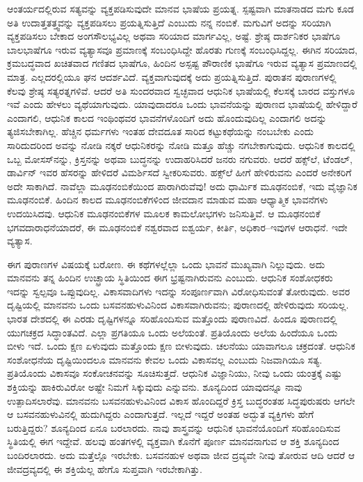 \vskip 0.2cm

ಆಂತರ್ಯದಲ್ಲಿರುವ ಸತ್ಯವನ್ನು ವ್ಯಕ್ತಪಡಿಸುವುದೇ ಮಾನವ ಭಾಷೆಯ ಪ್ರಯತ್ನ. ಸ್ಪಷ್ಟವಾಗಿ ಮಾತನಾಡದ ಮಗು ಕೂಡ ಅತಿ ಉದಾತ್ತತತ್ತ್ವವನ್ನು ವ್ಯಕ್ತಪಡಿಸಲು ಪ್ರಯತ್ನಿಸುತ್ತಿದೆ ಎಂಬುದು ನನ್ನ ನಂಬಿಕೆ. ಮಗುವಿಗೆ ಅದನ್ನು ಸರಿಯಾಗಿ ವ್ಯಕ್ತಪಡಿಸಲು ಬೇಕಾದ ಅಂಗಸೌಲಭ್ಯವಿಲ್ಲ ಅಥವಾ ಸರಿಯಾದ ಮಾರ್ಗವಿಲ್ಲ, ಅಷ್ಟೆ. ಶ್ರೇಷ್ಠ ದಾರ್ಶನಿಕರ ಭಾಷೆಗೂ ಬಾಲಭಾಷೆಗೂ ಇರುವ ವ್ಯತ್ಯಾಸವೂ ಪ್ರಮಾಣಕ್ಕೆ ಸಂಬಂಧಿಸಿದ್ದೇ ಹೊರತು ಗುಣಕ್ಕೆ ಸಂಬಂಧಿಸಿದ್ದಲ್ಲ. ಈಗಿನ ಸರಿಯಾದ, ಕ್ರಮಬದ್ಧವಾದ ಖಚಿತವಾದ ಗಣಿತದ ಭಾಷೆಗೂ, ಹಿಂದಿನ ಅಸ್ಪಷ್ಟ ಪೌರಾಣಿಕ ಭಾಷೆಗೂ ಇರುವ ವ್ಯತ್ಯಾಸ ಪ್ರಮಾಣದಲ್ಲಿ ಮಾತ್ರ. ಎಲ್ಲದರಲ್ಲಿಯೂ ಘನ ಆದರ್ಶವಿದೆ. ವ್ಯಕ್ತವಾಗುವುದಕ್ಕೆ ಅದು ಪ್ರಯತ್ನಿಸುತ್ತಿದೆ. ಪುರಾತನ ಪುರಾಣಗಳಲ್ಲಿ ಕೆಲವು ಶ್ರೇಷ್ಠ ಸತ್ಯರತ್ನಗಳಿವೆ. ಆದರೆ ಅತಿ ಸುಂದರವಾದ ಸ್ವಚ್ಛವಾದ ಆಧುನಿಕ ಭಾಷೆಯಲ್ಲಿ ಕೆಲಸಕ್ಕೆ ಬಾರದ ವಸ್ತುಗಳೂ ಇವೆ ಎಂದು ಹೇಳಲು ವ್ಯಥೆಯಾಗುವುದು. ಯಾವುದಾದರೂ ಒಂದು ಭಾವನೆಯನ್ನು ಪುರಾಣದ ಭಾಷೆಯಲ್ಲಿ ಹೇಳಿದ್ದಾರೆ ಎಂದಾಗಲಿ, ಆಧುನಿಕ ಕಾಲದ ಇಂಥಿಂಥವರ ಭಾವನೆಗಳೊಂದಿಗೆ ಅದು ಹೊಂದುವುದಿಲ್ಲ ಎಂದಾಗಲಿ ಅದನ್ನು ತ್ಯಜಿಸಬೇಕಾಗಿಲ್ಲ. ಹೆಚ್ಚಿನ ಧರ್ಮಗಳು ಇಂತಹ ದೇವದೂತ ಸಾರಿದ ಕಟ್ಟುಕಥೆಯನ್ನು ನಂಬಬೇಕು ಎಂದು ಸಾರಿದುದರಿಂದ ಅವನ್ನು ನೋಡಿ ನಕ್ಕರೆ ಆಧುನಿಕರನ್ನು ನೋಡಿ ಮತ್ತೂ ಹೆಚ್ಚು ನಗಬೇಕಾಗುವುದು. ಆಧುನಿಕ ಕಾಲದಲ್ಲಿ ಒಬ್ಬ ಮೋಸಸ್​ನನ್ನು, ಕ್ರಿಸ್ತನನ್ನು ಅಥವಾ ಬುದ್ಧನನ್ನು ಉದಾಹರಿಸಿದರೆ ಜನರು ನಗುವರು. ಆದರೆ ಹಕ್ಸ್​ಲೆ, ಟೆಂಡಲ್​, ಡಾರ್ವಿನ್​ ಇವರ ಹೆಸರನ್ನು ಹೇಳಿದರೆ ವಿಮರ್ಶಿಸದೆ ಸ್ವೀಕರಿಸುವರು. ಹಕ್ಸ್​ಲೆ ಹೀಗೆ ಹೇಳಿರುವನು ಎಂದರೆ ಅನೇಕರಿಗೆ ಅದೇ ಸಾಕಾಗಿದೆ. ನಾವೆಲ್ಲಾ ಮೂಢನಂಬಿಕೆಯಿಂದ ಪಾರಾಗಿರುವೆವು! ಅದು ಧಾರ್ಮಿಕ ಮೂಢನಂಬಿಕೆ, ಇದು ವೈಜ್ಞಾನಿಕ ಮೂಢನಂಬಿಕೆ. ಹಿಂದಿನ ಕಾಲದ ಮೂಢನಂಬಿಕೆಗಳಿಂದ ಜೀವದಾನ ಮಾಡುವ ಮಹಾ ಆಧ್ಯಾತ್ಮಿಕ ಭಾವನೆಗಳು ಉದಯಿಸಿದವು. ಆಧುನಿಕ ಮೂಢನಂಬಿಕೆಗಳ ಮೂಲಕ ಕಾಮಲೋಭಗಳು ಜನಿಸುತ್ತಿವೆ. ಆ ಮೂಢನಂಬಿಕೆ ಭಗವದಾರಾಧನೆಯಾದರೆ, ಈ ಮೂಢನಂಬಿಕೆ ನಶ್ವರವಾದ ಐಶ್ವರ್ಯ, ಕೀರ್ತಿ, ಅಧಿಕಾರ–ಇವುಗಳ ಆರಾಧನೆ. ಇದೇ ವ್ಯತ್ಯಾಸ.

\vskip 0.2cm
	
ಈಗ ಪುರಾಣಗಳ ವಿಷಯಕ್ಕೆ ಬರೋಣ. ಈ ಕಥೆಗಳಲ್ಲೆಲ್ಲಾ ಒಂದು ಭಾವನೆ ಮುಖ್ಯವಾಗಿ ನಿಲ್ಲುವುದು. ಅದು ಮಾನವನು ತನ್ನ ಹಿಂದಿನ ಉಚ್ಛ್ರಾಯ ಸ್ಥಿತಿಯಿಂದ ಈಗ ಭ್ರಷ್ಟನಾಗಿರುವನು ಎಂಬುದು. ಆಧುನಿಕ ಸಂಶೋಧಕರು ಇದನ್ನು ಸ್ವಲ್ಪವೂ ಒಪ್ಪುವುದಿಲ್ಲ. ವಿಕಾಸವಾದಿಗಳು ಇದನ್ನು ಸಂಪೂರ್ಣವಾಗಿ ವಿರೋಧಿಸುವಂತೆ ತೋರುವುದು. ಅವರ ದೃಷ್ಟಿಯಲ್ಲಿ ಮಾನವನು ಒಂದು ಬಸವನಹುಳುವಿನಿಂದ ವಿಕಾಸವಾಗಿರುವನು; ಪುರಾಣದಲ್ಲಿ ಹೇಳಿರುವುದು ಸರಿಯಲ್ಲ. ಭಾರತ ದೇಶದಲ್ಲಿ ಈ ಎರಡು ದೃಷ್ಟಿಗಳನ್ನೂ ಸರಿಹೊಂದಿಸುವ ಮತ್ತೊಂದು ಪುರಾಣವಿದೆ. ಹಿಂದೂ ಪುರಾಣದಲ್ಲಿ ಯುಗಚಕ್ರದ ಸಿದ್ಧಾಂತವಿದೆ. ಎಲ್ಲಾ ಪ್ರಗತಿಯೂ ಒಂದು ಅಲೆಯಂತೆ. ಪ್ರತಿಯೊಂದು ಅಲೆಯ ಹಿಂದೆಯೂ ಒಂದು ಬೀಳು ಇದೆ. ಒಂದು ಕ್ಷಣ ಏಳುವುದು ಮತ್ತೊಂದು ಕ್ಷಣ ಬೀಳುವುದು. ಚಲನೆಯು ಯಾವಾಗಲೂ ಚಕ್ರದಂತೆ. ಆಧುನಿಕ ಸಂಶೋಧನೆಯ ದೃಷ್ಟಿಯಿಂದಲೂ ಮಾನವನು ಕೇವಲ ಒಂದು ವಿಕಾಸವಲ್ಲ ಎಂಬುದು ನಿಜವಾಗಿಯೂ ಸತ್ಯ. ಪ್ರತಿಯೊಂದು ವಿಕಾಸವೂ ಸಂಕೋಚನವನ್ನು ಸೂಚಿಸುತ್ತದೆ. ಆಧುನಿಕ ವಿಜ್ಞಾನಿಯು, ನೀವು ಒಂದು ಯಂತ್ರಕ್ಕೆ ಎಷ್ಟು ಶಕ್ತಿಯನ್ನು ಹಾಕಿರುವಿರೋ ಅಷ್ಟೇ ನಿಮಗೆ ಸಿಕ್ಕುವುದು ಎನ್ನುವನು. ಶೂನ್ಯದಿಂದ ಯಾವುದನ್ನೂ ನಾವು ಉತ್ಪಾದಿಸಲಾರೆವು. ಮಾನವನು ಬಸವನಹುಳುವಿನಿಂದ ವಿಕಾಸ ಹೊಂದಿದ್ದರೆ ಕ್ರಿಸ್ತ ಬುದ್ಧರಂತಹ ಸಿದ್ಧಪುರುಷರು ಆಗಲೇ ಆ ಬಸವನಹುಳುವಿನಲ್ಲಿ ಹುದುಗಿದ್ದರು ಎಂದಾಗುತ್ತದೆ. ಇಲ್ಲದೆ ಇದ್ದರೆ ಅಂತಹ ಅದ್ಭುತ ವ್ಯಕ್ತಿಗಳು ಹೇಗೆ ಬರುತ್ತಿದ್ದರು? ಶೂನ್ಯದಿಂದ ಏನೂ ಬರಲಾರದು. ನಾವು ಶಾಸ್ತ್ರವನ್ನು ಆಧುನಿಕ ಭಾವನೆಯೊಂದಿಗೆ ಸರಿಹೊಂದಿಸುವ ಸ್ಥಿತಿಯಲ್ಲಿ ಈಗ ಇದ್ದೇವೆ. ಹಲವು ಹಂತಗಳಲ್ಲಿ ವ್ಯಕ್ತವಾಗಿ ಕೊನೆಗೆ ಪೂರ್ಣ ಮಾನವನಾಗುವ ಆ ಶಕ್ತಿ ಶೂನ್ಯದಿಂದ ಬಂದಿರಲಾರದು. ಅದು ಮತ್ತೆಲ್ಲೊ ಇರಬೇಕು. ಬಸವನಹುಳ ಅಥವಾ ಜೀವ ದ್ರವ್ಯವೇ ನೀವು ತೋರುವ ಆದಿ ಆದರೆ ಆ ಜೀವದ್ರವ್ಯದಲ್ಲಿ ಈ ಶಕ್ತಿಯೆಲ್ಲ ಹೇಗೊ ಸುಪ್ತವಾಗಿ ಇರಬೇಕಾಗಿತ್ತು.

